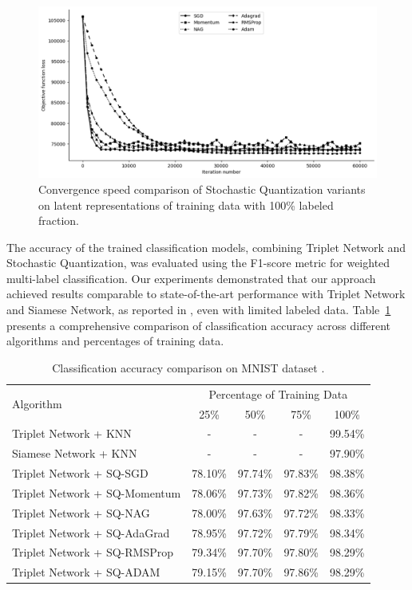\begin{figure}
    \centering
    \includegraphics[width=\textwidth]{figures/convergence/sq_convergence_100.png}
    \caption{Convergence speed comparison of Stochastic Quantization variants on latent representations of training data with 100\% labeled fraction.}
    \label{convergence:fig}
\end{figure}

The accuracy of the trained classification models, combining Triplet Network and Stochastic Quantization, was evaluated using the F1-score metric \cite{Chinchor_1992} for weighted multi-label classification. Our experiments demonstrated that our approach achieved results comparable to state-of-the-art performance with Triplet Network and Siamese Network, as reported in \cite{Hoffer_2015}, even with limited labeled data. Table~\ref{accuracy:table} presents a comprehensive comparison of classification accuracy across different algorithms and percentages of training data.

\begin{table}
\caption{Classification accuracy comparison on MNIST dataset \cite{lecun2010mnist}.}
    \label{accuracy:table}
    \begin{tabularx}{\textwidth}{|X|*{4}{c|}}
        \hline
        \multirow{2}{*}{Algorithm} & \multicolumn{4}{c|}{Percentage of Training Data} \\
        \cline{2-5}
        & 25\% & 50\% & 75\% & 100\% \\
        \hline
        Triplet Network + KNN         &    -    &    -    &    -    & 99.54\% \\
        Siamese Network + KNN         &    -    &    -    &    -    & 97.90\% \\
        Triplet Network + SQ-SGD      & 78.10\% & 97.74\% & 97.83\% & 98.38\% \\
        Triplet Network + SQ-Momentum & 78.06\% & 97.73\% & 97.82\% & 98.36\% \\
        Triplet Network + SQ-NAG      & 78.00\% & 97.63\% & 97.72\% & 98.33\% \\
        Triplet Network + SQ-AdaGrad  & 78.95\% & 97.72\% & 97.79\% & 98.34\% \\
        Triplet Network + SQ-RMSProp  & 79.34\% & 97.70\% & 97.80\% & 98.29\% \\
        Triplet Network + SQ-ADAM     & 79.15\% & 97.70\% & 97.86\% & 98.29\% \\
        \hline
    \end{tabularx}
\end{table}
